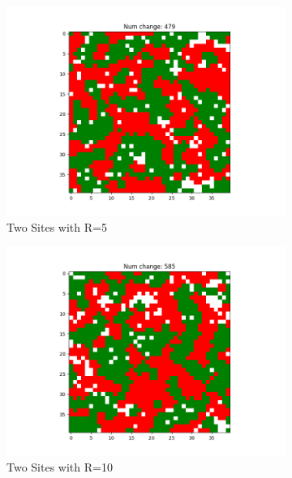 \documentclass[11pt]{article}
\begin{document}
	\begin{figure}[h]
		\centering
		\begin{subfigure}{0.14\textwidth}
			\includegraphics[width=\linewidth]{policy3_Final_h2r5.png}
			\caption{\centering Two Sites with R=5}
		\end{subfigure}\hfill
		\begin{subfigure}{0.14\textwidth}
			\includegraphics[width=\linewidth]{policy3_final_h2r10.png}
			\caption{\centering Two Sites with R=10}
		\end{subfigure}\hfill
		\begin{subfigure}{0.14\textwidth}

\end{subfigure}
\end{figure}
\end{document}
